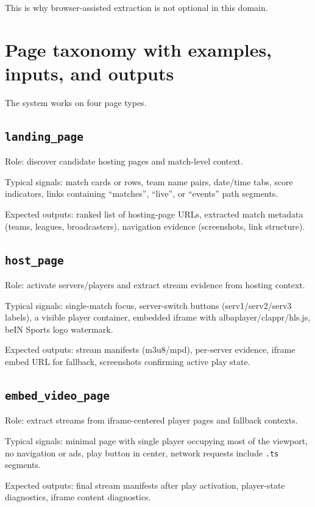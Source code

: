 This is why browser-assisted extraction is not optional in this domain.

\section{Page taxonomy with examples, inputs, and outputs}

The system works on four page types.

\subsection{\texttt{landing\_page}}

Role: discover candidate hosting pages and match-level context.

Typical signals: match cards or rows, team name pairs, date/time tabs, score indicators,
links containing ``matches'', ``live'', or ``events'' path segments.

Expected outputs: ranked list of hosting-page URLs, extracted match metadata (teams,
leagues, broadcasters), navigation evidence (screenshots, link structure).

\subsection{\texttt{host\_page}}

Role: activate servers/players and extract stream evidence from hosting context.

Typical signals: single-match focus, server-switch buttons (serv1/serv2/serv3 labels),
a visible player container, embedded iframe with albaplayer/clappr/hls.js, beIN Sports
logo watermark.

Expected outputs: stream manifests (m3u8/mpd), per-server evidence, iframe embed URL
for fallback, screenshots confirming active play state.

\subsection{\texttt{embed\_video\_page}}

Role: extract streams from iframe-centered player pages and fallback contexts.

Typical signals: minimal page with single player occupying most of the viewport, no
navigation or ads, play button in center, network requests include \texttt{.ts} segments.

Expected outputs: final stream manifests after play activation, player-state diagnostics,
iframe content diagnostics.

